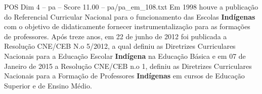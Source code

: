 \begin{textsample}{POS Dim 4 – pa – Score 11.00 – pa/pa\_em\_108.txt}
Em 1998 houve a publicação do Referencial Curricular Nacional para o funcionamento das Escolas \textbf{Indígenas} com o objetivo de didaticamente fornecer instrumentalização para as formações de professores.
Após treze anos, em 22 de junho de 2012 foi publicada a Resolução CNE/CEB N.o 5/2012, a qual definiu as Diretrizes Curriculares Nacionais para a Educação Escolar \textbf{Indígena} na Educação Básica e em 07 de Janeiro de 2015 a Resolução CNE/CEB n.o 1, definiu as Diretrizes Curriculares Nacionais para a Formação de Professores \textbf{Indígenas} em cursos de Educação Superior e de Ensino Médio.

\end{textsample}

